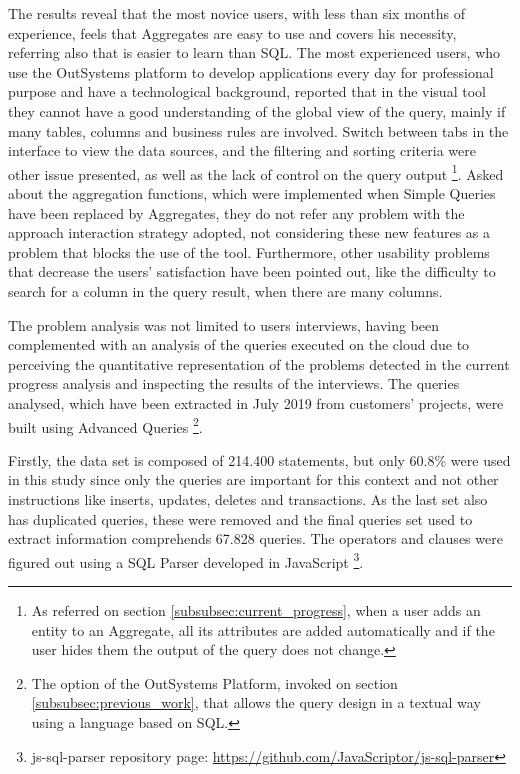 The results reveal that the most novice users, with less than six months of experience, feels that Aggregates are easy to use and covers his necessity, referring also that is easier to learn than SQL. The most experienced users, who use the OutSystems platform to develop applications every day for professional purpose and have a technological background, reported that in the visual tool they cannot have a good understanding of the global view of the query, mainly if many tables, columns and business rules are involved. Switch between tabs in the interface to view the data sources, and the filtering and sorting criteria were other issue presented, as well as the lack of control on the query output \footnote{As referred on section \ref{subsubsec:current_progress}, when a user adds an entity to an Aggregate, all its attributes are added automatically and if the user hides them the output of the query does not change.}. Asked about the aggregation functions, which were implemented when Simple Queries have been replaced by Aggregates, they do not refer any problem with the approach interaction strategy adopted, not considering these new features as a problem that blocks the use of the tool. Furthermore, other usability problems that decrease the users’ satisfaction have been pointed out, like the difficulty to search for a column in the query result, when there are many columns.

The problem analysis was not limited to users interviews, having been complemented with an analysis of the queries executed on the cloud due to perceiving the quantitative representation of the problems detected in the current progress analysis and inspecting the results of the interviews. The queries analysed, which have been extracted in July 2019 from customers’ projects, were built using Advanced Queries \footnote{The option of the OutSystems Platform, invoked on section \ref{subsubsec:previous_work}, that allows the query design in a textual way using a language based on SQL.}.

Firstly, the data set is composed of 214.400 statements, but only 60.8\% were used in this study since only the queries are important for this context and not other instructions like inserts, updates, deletes and transactions. As the last set also has duplicated queries, these were removed and the final queries set used to extract information comprehends 67.828 queries. The operators and clauses were figured out using a SQL Parser developed in JavaScript \footnote{js-sql-parser repository page: \url{https://github.com/JavaScriptor/js-sql-parser}}.

